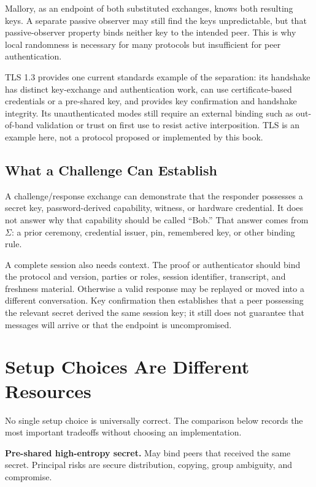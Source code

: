 Mallory, as an endpoint of both substituted exchanges, knows both resulting
keys.  A separate passive observer may still find the keys unpredictable, but
that passive-observer property binds neither key to the intended peer.  This is
why local randomness is necessary for many protocols but insufficient for peer
authentication.

TLS 1.3 provides one current standards example of the separation: its
handshake has distinct key-exchange and authentication work, can use
certificate-based credentials or a pre-shared key, and provides key
confirmation and handshake integrity.  Its unauthenticated modes still require
an external binding such as out-of-band validation or trust on first use to
resist active interposition\cite{rfc9846tls13}.  TLS is an example here, not a
protocol proposed or implemented by this book.

\subsection{What a Challenge Can Establish}

A challenge/response exchange can demonstrate that the responder possesses a
secret key, password-derived capability, witness, or hardware credential.  It
does not answer why that capability should be called ``Bob.''  That answer
comes from $\Sigma$: a prior ceremony, credential issuer, pin, remembered key,
or other binding rule.

A complete session also needs context.  The proof or authenticator should bind
the protocol and version, parties or roles, session identifier, transcript,
and freshness material.  Otherwise a valid response may be replayed or moved
into a different conversation.  Key confirmation then establishes that a peer
possessing the relevant secret derived the same session key; it still does not
guarantee that messages will arrive or that the endpoint is uncompromised.

\section{Setup Choices Are Different Resources}

No single setup choice is universally correct.  The comparison below records
the most important tradeoffs without choosing an implementation.

\noindent\textbf{Pre-shared high-entropy secret.}
May bind peers that received the same secret.  Principal risks are secure
distribution, copying, group ambiguity, and compromise.

